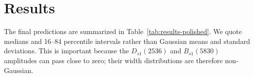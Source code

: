 \documentclass[11pt]{article}
\newcommand{\Dsone}{D_{s1}}
\newcommand{\Bsone}{B_{s1}}
\begin{document}
\begin{table}[htbp]
  \centering
  \caption{Pure-current benchmark for the charm residue model.  Wang's value
  tests the pure $J_A$ scale.  The physical mixed-current residues require an
  assumption about the $AA/BB$ overlap.  Decay constants are in GeV.}
  \label{tab:residue-benchmark-polished}
\end{table}

\section{Results}

The final predictions are summarized in Table~\ref{tab:results-polished}.  We
quote medians and 16--84 percentile intervals rather than Gaussian means and
standard deviations.  This is important because the $\Dsone(2536)$ and
$\Bsone(5830)$ amplitudes can pass close to zero; their width distributions are
therefore non-Gaussian.
\end{document}
